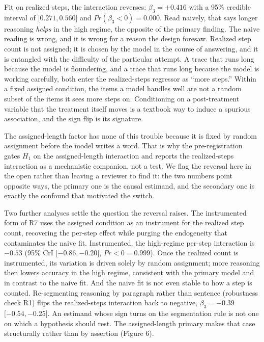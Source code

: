 \documentclass{article}
\begin{document}
Fit on realized steps, the interaction reverses: \(\beta_{3} = + 0.416\)
with a 95\% credible interval of \(\lbrack 0.271,0.560\rbrack\) and
\(Pr(\beta_{3} < 0) = 0.000\). Read naively, that says longer reasoning
\emph{helps} in the high regime, the opposite of the primary finding.
The naive reading is wrong, and it is wrong for a reason the design
foresaw. Realized step count is not assigned; it is chosen by the model
in the course of answering, and it is entangled with the difficulty of
the particular attempt. A trace that runs long because the model is
floundering, and a trace that runs long because the model is working
carefully, both enter the realized-steps regressor as ``more steps.''
Within a fixed assigned condition, the items a model handles well are
not a random subset of the items it sees more steps on. Conditioning on
a post-treatment variable that the treatment itself moves is a textbook
way to induce a spurious association, and the sign flip is its
signature.

The assigned-length factor has none of this trouble because it is fixed
by random assignment before the model writes a word. That is why the
pre-registration gates \(H_{1}\) on the assigned-length interaction and
reports the realized-steps interaction as a mechanistic companion, not a
test. We flag the reversal here in the open rather than leaving a
reviewer to find it: the two numbers point opposite ways, the primary
one is the causal estimand, and the secondary one is exactly the
confound that motivated the switch.

Two further analyses settle the question the reversal raises. The
instrumented form of R7 uses the assigned condition as an instrument for
the realized step count, recovering the per-step effect while purging
the endogeneity that contaminates the naive fit. Instrumented, the
high-regime per-step interaction is \(- 0.53\) (95\% CrI
\(\lbrack - 0.86, - 0.20\rbrack\), \(Pr < 0 = 0.999\)). Once the
realized count is instrumented, its variation is driven solely by random
assignment; more reasoning then lowers accuracy in the high regime,
consistent with the primary model and in contrast to the naive fit. And
the naive fit is not even stable to how a step is counted. Re-segmenting
reasoning by paragraph rather than sentence (robustness check R1) flips
the realized-steps interaction back to negative, \(\beta_{3} = - 0.39\)
\(\lbrack - 0.54, - 0.25\rbrack\). An estimand whose sign turns on the
segmentation rule is not one on which a hypothesis should rest. The
assigned-length primary makes that case structurally rather than by
assertion (Figure 6).
\end{document}
